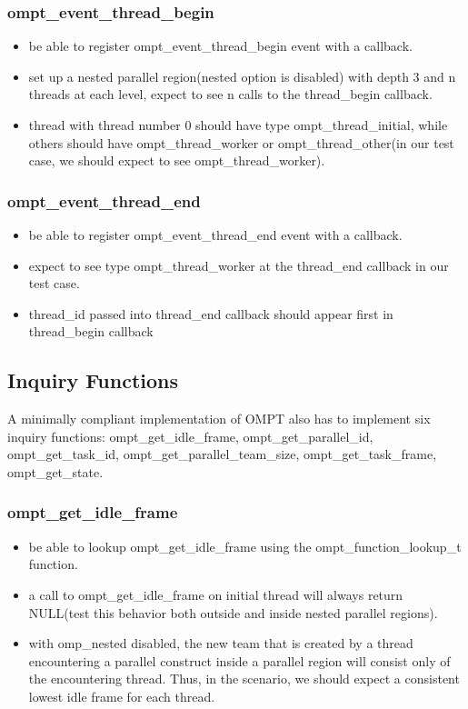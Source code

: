 \documentclass{article}
\begin{document}
\subsubsection{ompt\_event\_thread\_begin}
    \begin{itemize}
        \item  be able to register ompt\_event\_thread\_begin event with a callback.
        \item  set up a nested parallel region(nested option is disabled) with depth 3 and n threads at each level, expect to see n calls to the thread\_begin callback.
        \item  thread with thread number 0 should have type ompt\_thread\_initial, while others should have ompt\_thread\_worker or ompt\_thread\_other(in our test case,
            we should expect to see ompt\_thread\_worker).
    \end{itemize}

\subsubsection{ompt\_event\_thread\_end}
    \begin{itemize}
        \item  be able to register ompt\_event\_thread\_end event with a callback.
        \item  expect to see type ompt\_thread\_worker at the thread\_end callback in our test case.
        \item  thread\_id passed into thread\_end callback should appear first in thread\_begin callback
    \end{itemize}

\subsection{Inquiry Functions}
A minimally compliant implementation of OMPT also has to implement six  inquiry functions:
ompt\_get\_idle\_frame, ompt\_get\_parallel\_id, ompt\_get\_task\_id, ompt\_get\_parallel\_team\_size, ompt\_get\_task\_frame, ompt\_get\_state.

\subsubsection{ompt\_get\_idle\_frame}
    \begin{itemize}
        \item  be able to lookup ompt\_get\_idle\_frame using the ompt\_function\_lookup\_t function.
        \item  a call to ompt\_get\_idle\_frame on initial thread will always return NULL(test this behavior both outside and inside nested parallel regions).
        \item  with omp\_nested disabled, the new team that is created by a thread encountering a parallel construct inside a parallel region will consist
            only of the encountering thread.  Thus, in the scenario, we should expect a consistent lowest idle frame for each thread.
    \end{itemize}
\end{document}
